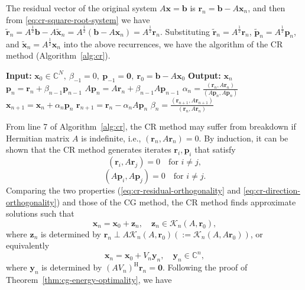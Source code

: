 {The residual vector of the original system $A\bm x=\bm b$ is $\bm r_n=\bm b-A\bm x_n$, and then from \eqref{eq:cr-square-root-system} we have $\widetilde{\bm r}_n=A^{\frac12}\bm b-A\widetilde{\bm x}_n=A^{\frac12}(\bm b-A\bm x_n)=A^{\frac12}\bm r_n$. Substituting $\widetilde{\bm r}_n=A^{\frac12}\bm r_n$, $\widetilde{\bm p}_n=A^{\frac12}\bm p_n$, and $\widetilde{\bm x}_n=A^{\frac12}\bm x_n$ into the above recurrences, we have the algorithm of the CR method (Algorithm\ \ref{alg:cr}).}
\begin{algorithm}[H]\caption{{The CR method}}\label{alg:cr}\begin{algorithmic}[1]
\Statex\textbf{Input:} $\bm x_0\in\mathbb C^N,\ \beta_{-1}=0,\ \bm p_{-1}=\bm0,\ \bm r_0=\bm b-A\bm x_0$
\Statex\textbf{Output:} $\bm x_n$
\State $\bm p_n=\bm r_n+\beta_{n-1}\bm p_{n-1}$
\State $A\bm p_n=A\bm r_n+\beta_{n-1}A\bm p_{n-1}$
\State $\alpha_n=\frac{(\bm r_n,A\bm r_n)}{(A\bm p_n,A\bm p_n)}$
\State $\bm x_{n+1}=\bm x_n+\alpha_n\bm p_n$
\State $\bm r_{n+1}=\bm r_n-\alpha_nA\bm p_n$
\State $\beta_n=\frac{(\bm r_{n+1},A\bm r_{n+1})}{(\bm r_n,A\bm r_n)}$
\EndFor\end{algorithmic}\end{algorithm}
{From line 7 of Algorithm\ \ref{alg:cr}, the CR method may suffer from breakdown if Hermitian matrix $A$ is indefinite, i.e., $(\bm r_n,A\bm r_n)=0$. By induction, it can be shown that the CR method generates iterates $\bm r_i,\bm p_i$ that satisfy}
\begin{equation}\label{eq:cr-residual-orthogonality}(\bm r_i,A\bm r_j)=0\quad\text{for }i\ne j,\end{equation}
\begin{equation}\label{eq:cr-direction-orthogonality}(A\bm p_i,A\bm p_j)=0\quad\text{for }i\ne j.\end{equation}
{Comparing the two properties (\eqref{eq:cr-residual-orthogonality} and \eqref{eq:cr-direction-orthogonality}) and those of the CG method, the CR method finds approximate solutions such that}
\[\bm x_n=\bm x_0+\bm z_n,\quad\bm z_n\in\mathcal K_n(A,\bm r_0),\]
{where $\bm z_n$ is determined by $\bm r_n\perp A\mathcal K_n(A,\bm r_0)(:=\mathcal K_n(A,A\bm r_0))$, or equivalently}
\[\bm x_n=\bm x_0+V_n\bm y_n,\quad\bm y_n\in\mathbb C^n,\]
{where $\bm y_n$ is determined by $(AV_n)^{\mathrm H}\bm r_n=\bm0$. Following the proof of Theorem\ \ref{thm:cg-energy-optimality}, we have}
